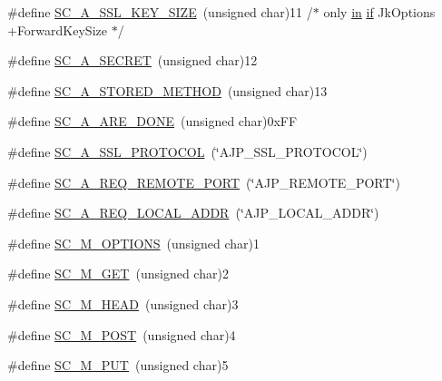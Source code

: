 \begin{DoxyCompactItemize}
\item 
\#define \hyperlink{group__AJP__defines_gad248165ca70668520f3bd442a8674699}{S\+C\+\_\+\+A\+\_\+\+S\+S\+L\+\_\+\+K\+E\+Y\+\_\+\+S\+I\+ZE}~(unsigned char)11       /$\ast$ only \hyperlink{group__apr__thread__proc_ga2e46fea00cc2238744ebca5061c62bcc}{in} \hyperlink{util__expr__scan_8c_aa1a71763978093648dffef60b56f7447}{if} Jk\+Options +Forward\+Key\+Size $\ast$/
\item 
\#define \hyperlink{group__AJP__defines_ga61b00a53f420d52f542dfe217eb673cd}{S\+C\+\_\+\+A\+\_\+\+S\+E\+C\+R\+ET}~(unsigned char)12
\item 
\#define \hyperlink{group__AJP__defines_ga76bee9f139f36e85240191d002a9eff6}{S\+C\+\_\+\+A\+\_\+\+S\+T\+O\+R\+E\+D\+\_\+\+M\+E\+T\+H\+OD}~(unsigned char)13
\item 
\#define \hyperlink{group__AJP__defines_gab0f5211c01a84ac5db8f7186720e2294}{S\+C\+\_\+\+A\+\_\+\+A\+R\+E\+\_\+\+D\+O\+NE}~(unsigned char)0x\+FF
\item 
\#define \hyperlink{group__AJP__defines_gaf469dd8f5387b7e2e940a52600062851}{S\+C\+\_\+\+A\+\_\+\+S\+S\+L\+\_\+\+P\+R\+O\+T\+O\+C\+OL}~(\char`\"{}A\+J\+P\+\_\+\+S\+S\+L\+\_\+\+P\+R\+O\+T\+O\+C\+OL\char`\"{})
\item 
\#define \hyperlink{group__AJP__defines_ga536c1a7faad0808b874485ae9c4468ef}{S\+C\+\_\+\+A\+\_\+\+R\+E\+Q\+\_\+\+R\+E\+M\+O\+T\+E\+\_\+\+P\+O\+RT}~(\char`\"{}A\+J\+P\+\_\+\+R\+E\+M\+O\+T\+E\+\_\+\+P\+O\+RT\char`\"{})
\item 
\#define \hyperlink{group__AJP__defines_gae88d677762d82fed0fce297eb6037cf6}{S\+C\+\_\+\+A\+\_\+\+R\+E\+Q\+\_\+\+L\+O\+C\+A\+L\+\_\+\+A\+D\+DR}~(\char`\"{}A\+J\+P\+\_\+\+L\+O\+C\+A\+L\+\_\+\+A\+D\+DR\char`\"{})
\item 
\#define \hyperlink{group__AJP__defines_ga272525ab33a9a6c493768a11715a20fc}{S\+C\+\_\+\+M\+\_\+\+O\+P\+T\+I\+O\+NS}~(unsigned char)1
\item 
\#define \hyperlink{group__AJP__defines_ga5112513c5c6e5f0b34c9a92c4fda6ec6}{S\+C\+\_\+\+M\+\_\+\+G\+ET}~(unsigned char)2
\item 
\#define \hyperlink{group__AJP__defines_ga20356b88123b39d0ae68923474df1fe8}{S\+C\+\_\+\+M\+\_\+\+H\+E\+AD}~(unsigned char)3
\item 
\#define \hyperlink{group__AJP__defines_gaf63271fdd794d596659126c9b0827d39}{S\+C\+\_\+\+M\+\_\+\+P\+O\+ST}~(unsigned char)4
\item 
\#define \hyperlink{group__AJP__defines_ga6b8686cb5e234ec5895f12c20f2e15c7}{S\+C\+\_\+\+M\+\_\+\+P\+UT}~(unsigned char)5

\end{DoxyCompactItemize}
